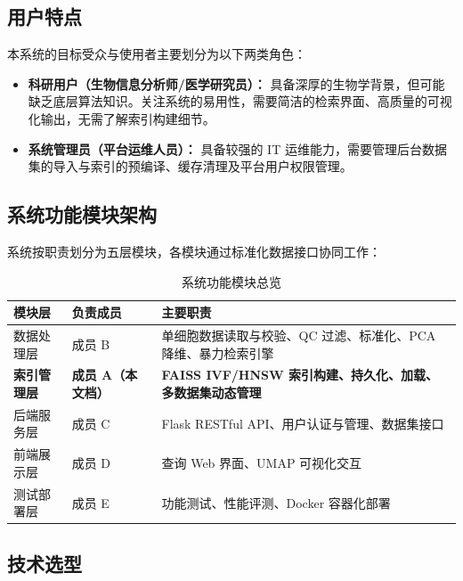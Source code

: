 \documentclass[a4paper]{article}
\begin{document}
\subsection{用户特点}
本系统的目标受众与使用者主要划分为以下两类角色：
\begin{itemize}
    \item \textbf{科研用户（生物信息分析师/医学研究员）：} 具备深厚的生物学背景，但可能缺乏底层算法知识。关注系统的易用性，需要简洁的检索界面、高质量的可视化输出，无需了解索引构建细节。
    \item \textbf{系统管理员（平台运维人员）：} 具备较强的 IT 运维能力，需要管理后台数据集的导入与索引的预编译、缓存清理及平台用户权限管理。
\end{itemize}

\subsection{系统功能模块架构}
系统按职责划分为五层模块，各模块通过标准化数据接口协同工作：

\begin{table}[H]
\centering
\small
\caption{系统功能模块总览}
\begin{tabularx}{\linewidth}{p{2.5cm}p{2.5cm}X}
\toprule
模块层 & 负责成员 & 主要职责 \\
\midrule
数据处理层 & 成员 B & 单细胞数据读取与校验、QC 过滤、标准化、PCA 降维、暴力检索引擎 \\
\textbf{索引管理层} & \textbf{成员 A（本文档）} & \textbf{FAISS IVF/HNSW 索引构建、持久化、加载、多数据集动态管理} \\
后端服务层 & 成员 C & Flask RESTful API、用户认证与管理、数据集接口 \\
前端展示层 & 成员 D & 查询 Web 界面、UMAP 可视化交互 \\
测试部署层 & 成员 E & 功能测试、性能评测、Docker 容器化部署 \\
\bottomrule
\end{tabularx}
\end{table}

\subsection{技术选型}
\end{document}
